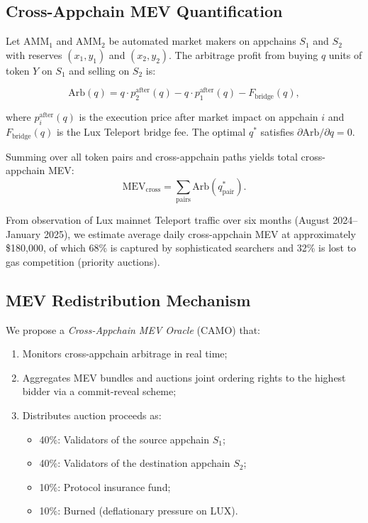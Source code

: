 \subsection{Cross-Appchain MEV Quantification}

Let $\text{AMM}_1$ and $\text{AMM}_2$ be automated market makers on appchains $S_1$ and
$S_2$ with reserves $(x_1, y_1)$ and $(x_2, y_2)$. The arbitrage profit from buying $q$
units of token $Y$ on $S_1$ and selling on $S_2$ is:

\begin{equation}
\text{Arb}(q) = q \cdot p_2^{\text{after}}(q) - q \cdot p_1^{\text{after}}(q) - F_{\text{bridge}}(q),
\label{eq:arb}
\end{equation}

where $p_i^{\text{after}}(q)$ is the execution price after market impact on appchain $i$
and $F_{\text{bridge}}(q)$ is the Lux Teleport bridge fee. The optimal $q^*$ satisfies
$\partial \text{Arb}/\partial q = 0$.

Summing over all token pairs and cross-appchain paths yields total cross-appchain MEV:
\[
  \text{MEV}_{\text{cross}} = \sum_{\text{pairs}} \text{Arb}(q^*_{\text{pair}}).
\]

From observation of Lux mainnet Teleport traffic over six months (August 2024--January
2025), we estimate average daily cross-appchain MEV at approximately \$180,000, of which
68\% is captured by sophisticated searchers and 32\% is lost to gas competition
(priority auctions).

\subsection{MEV Redistribution Mechanism}

We propose a \emph{Cross-Appchain MEV Oracle} (CAMO) that:
\begin{enumerate}[leftmargin=1.5em]
  \item Monitors cross-appchain arbitrage in real time;
  \item Aggregates MEV bundles and auctions joint ordering rights to the highest bidder
    via a commit-reveal scheme;
  \item Distributes auction proceeds as:
    \begin{itemize}
      \item 40\%: Validators of the source appchain $S_1$;
      \item 40\%: Validators of the destination appchain $S_2$;
      \item 10\%: Protocol insurance fund;
      \item 10\%: Burned (deflationary pressure on LUX).
    \end{itemize}
\end{enumerate}

